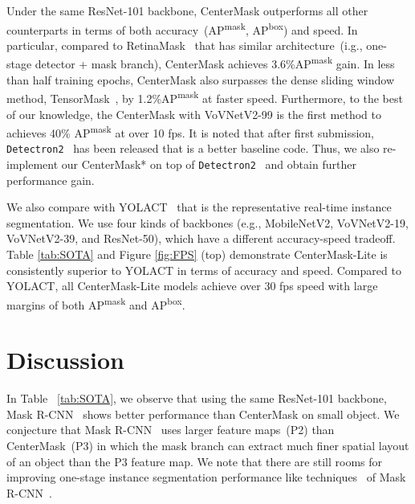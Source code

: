 \documentclass[10pt,twocolumn,letterpaper]{article}
\begin{document}
Under the same ResNet-101 backbone, CenterMask outperforms all other counterparts in terms of both accuracy~(AP\textsuperscript{mask}, AP\textsuperscript{box}) and speed.
In particular, compared to RetinaMask~\cite{fu2019retinamask} that has similar architecture~(i.g., one-stage detector + mask branch), CenterMask achieves 3.6\%AP\textsuperscript{mask} gain.
In less than half training epochs, CenterMask also surpasses the dense sliding window method, TensorMask~\cite{Chen_2019_ICCV}, by 1.2\%AP\textsuperscript{mask} at  faster speed.
Furthermore, to the best of our knowledge, the CenterMask with VoVNetV2-99 is the first method to achieves 40\% AP\textsuperscript{mask} at over 10 fps.
It is noted that after first submission, \texttt{Detectron2}~\cite{wu2019detectron2} has been released that is a better baseline code.
Thus, we also re-implement our CenterMask* on top of \texttt{Detectron2}~\cite{wu2019detectron2} and obtain further performance gain.


We also compare with YOLACT~\cite{Bolya_2019_ICCV} that is the representative real-time instance segmentation.
We use four kinds of backbones (e.g., MobileNetV2, VoVNetV2-19, VoVNetV2-39, and ResNet-50), which have a different accuracy-speed tradeoff.
Table \ref{tab:SOTA} and Figure \ref{fig:FPS} (top) demonstrate CenterMask-Lite is consistently superior to YOLACT in terms of accuracy and speed.
Compared to YOLACT, all CenterMask-Lite models achieve over 30 fps speed with large margins of both AP\textsuperscript{mask} and AP\textsuperscript{box}.




\section{Discussion}
\noindent
In Table ~\ref{tab:SOTA}, we observe that using the same ResNet-101 backbone, Mask R-CNN~\cite{he2017mask} shows better performance than CenterMask on small object.
We conjecture that Mask R-CNN~\cite{he2017mask} uses larger feature maps~(P2) than CenterMask~(P3) in which the mask branch can extract much finer spatial layout of an object than the P3 feature map.
We note that there are still rooms for improving one-stage instance segmentation performance like techniques~\cite{cai2018cascade,chen2019hybrid} of Mask R-CNN~\cite{he2017mask}. 
\end{document}

